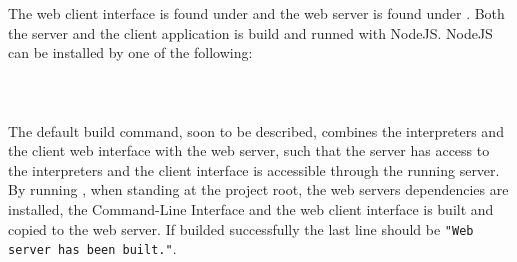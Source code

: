 The web client interface is found under  and the web server is found under .
Both the server and the client application is build and runned with NodeJS. NodeJS can be installed by one of the following:\\
\\
\\
\\

\noindent
The default build command, soon to be described, combines the interpreters and the client web interface with the web server, such that the server has access to the interpreters and the client interface is accessible through the running server.\\
By running , when standing at the project root, the web servers dependencies are installed, the Command-Line Interface and the web client interface is built and copied to the web server.
If builded successfully the last line should be \texttt{"Web server has been built."}.
